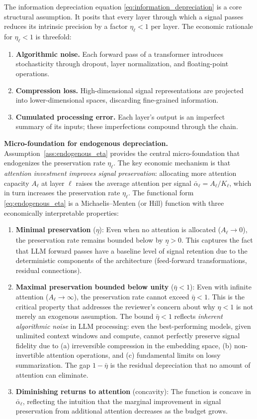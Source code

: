 The information depreciation equation \eqref{eq:information_depreciation} is a core structural assumption. It posits that every layer through which a signal passes reduces its intrinsic precision by a factor $\eta_\ell < 1$ per layer. The economic rationale for $\eta_\ell < 1$ is threefold:
\begin{enumerate}
\item \textbf{Algorithmic noise.} Each forward pass of a transformer introduces stochasticity through dropout, layer normalization, and floating-point operations.
\item \textbf{Compression loss.} High-dimensional signal representations are projected into lower-dimensional spaces, discarding fine-grained information.
\item \textbf{Cumulated processing error.} Each layer's output is an imperfect summary of its inputs; these imperfections compound through the chain.
\end{enumerate}

\textbf{Micro-foundation for endogenous depreciation.} Assumption~\ref{ass:endogenous_eta} provides the central micro-foundation that endogenizes the preservation rate $\eta_\ell$. The key economic mechanism is that \emph{attention investment improves signal preservation}: allocating more attention capacity $A_\ell$ at layer $\ell$ raises the average attention per signal $\bar{\alpha}_\ell = A_\ell / K_\ell$, which in turn increases the preservation rate $\eta_\ell$. The functional form \eqref{eq:endogenous_eta} is a Michaelis--Menten (or Hill) function with three economically interpretable properties:
\begin{enumerate}[label=(\roman*)]
\item \textbf{Minimal preservation} ($\underline{\eta}$): Even when no attention is allocated ($A_\ell \to 0$), the preservation rate remains bounded below by $\underline{\eta} > 0$. This captures the fact that LLM forward passes have a baseline level of signal retention due to the deterministic components of the architecture (feed-forward transformations, residual connections).
\item \textbf{Maximal preservation bounded below unity} ($\bar{\eta} < 1$): Even with infinite attention ($A_\ell \to \infty$), the preservation rate cannot exceed $\bar{\eta} < 1$. This is the critical property that addresses the reviewer's concern about why $\eta < 1$ is not merely an exogenous assumption. The bound $\bar{\eta} < 1$ reflects \emph{inherent algorithmic noise} in LLM processing: even the best-performing models, given unlimited context windows and compute, cannot perfectly preserve signal fidelity due to (a) irreversible compression in the embedding space, (b) non-invertible attention operations, and (c) fundamental limits on lossy summarization. The gap $1 - \bar{\eta}$ is the residual depreciation that no amount of attention can eliminate.
\item \textbf{Diminishing returns to attention} (concavity): The function is concave in $\bar{\alpha}_\ell$, reflecting the intuition that the marginal improvement in signal preservation from additional attention decreases as the budget grows.
\end{enumerate}

